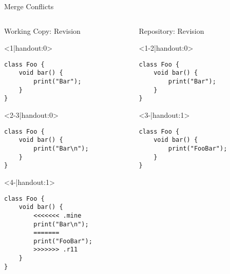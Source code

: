 \begin{frame}[fragile]{Merge Conflicts}	%
	\begin{columns}[T, onlytextwidth]
		\begin{column}{0.6\linewidth}
			\begin{columns}[T]
				\begin{column}{0.5\linewidth}
					Working Copy: Revision \only<4>{\emph{11$^*$}}\\[2mm]
					
					\begin{onlyenv}<1|handout:0>
						\begin{lstlisting}[style=java,basicstyle=\fontfamily{pcr}\small\selectfont,numbers=none,escapechar=|]
class Foo {
	void bar() {
		print("Bar");
	}
}	
						\end{lstlisting}
					\end{onlyenv}
					\begin{onlyenv}
						\begin{lstlisting}[style=java,basicstyle=\fontfamily{pcr}\small\selectfont,numbers=none,escapechar=|]
class Foo {
	void bar() {
		print("Bar\n");
	}
}
						\end{lstlisting}
					\end{onlyenv}
					\begin{onlyenv}
						\begin{lstlisting}[style=java,basicstyle=\fontfamily{pcr}\small\selectfont,numbers=none,escapechar=|]
class Foo {
	void bar() {		
		<<<<<<< .mine
		print("Bar\n");
		=======
		print("FooBar");
		>>>>>>> .r11
	}
}	
						\end{lstlisting}
					\end{onlyenv}
				\end{column}
				\begin{column}{0.5\linewidth}					
					Repository: Revision \only<3->{\emph{11}}
					
					\begin{onlyenv}
						\begin{lstlisting}[style=java,basicstyle=\fontfamily{pcr}\small\selectfont,numbers=none,escapechar=|]
class Foo {
	void bar() {
		print("Bar");
	}
}
						\end{lstlisting}
					\end{onlyenv}
					\begin{onlyenv}
						\begin{lstlisting}[style=java,basicstyle=\fontfamily{pcr}\small\selectfont,numbers=none,escapechar=|]
class Foo {
	void bar() {
		print("FooBar");
	}
}
						\end{lstlisting}
					\end{onlyenv}
				\end{column}
			\end{columns}
			

\end{column}
\end{columns}
\end{frame}
